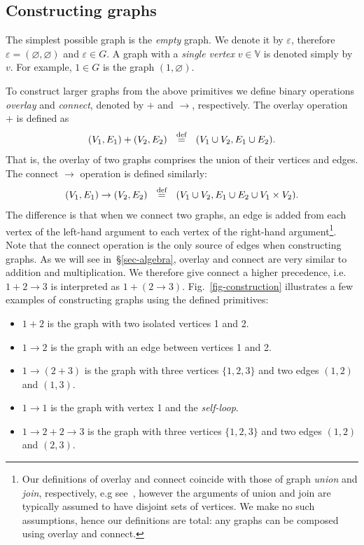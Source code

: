 \subsection{Constructing graphs}\label{sub-constructing}

The simplest possible graph is the \emph{empty} graph. We denote it by
$\varepsilon$, therefore $\varepsilon = (\varnothing, \varnothing)$ and
$\varepsilon \in G$. A graph with a \emph{single vertex} $v \in \mathbb{V}$
is denoted simply by $v$. For example, $1 \in G$ is the graph
$({1}, \varnothing)$.

To construct larger graphs from the above primitives we define binary
operations \emph{overlay} and \emph{connect}, denoted by $+$ and $\rightarrow$,
respectively. The overlay operation $+$ is defined as
\[
(V_1, E_1) + (V_2, E_2)~~\stackrel{\text{def}}{=}~~(V_1 \cup V_2, E_1 \cup E_2).
\]
That is, the overlay of two graphs comprises the union of their vertices and edges.
The connect $\rightarrow$ operation is defined similarly:
\[
(V_1, E_1) \rightarrow (V_2, E_2)~~\stackrel{\text{def}}{=}~~(V_1 \cup V_2, E_1 \cup E_2 \cup V_1 \times V_2).
\]
The difference is that when we connect two graphs, an edge is added from each
vertex of the left-hand argument to each vertex of the right-hand
argument\footnote{Our definitions of overlay and connect coincide
with those of graph \emph{union} and \emph{join}, respectively,
e.g see~\citet{1969_graph_theory_harary},
however the arguments of union and join are typically assumed to have disjoint
sets of vertices. We make no such assumptions, hence our definitions are total:
any graphs can be composed using overlay and connect.}.
Note that the connect operation is the only source of edges when constructing
graphs. As we will see in~\S\ref{sec-algebra}, overlay and connect
are very similar to addition and multiplication. We therefore give connect a higher
precedence, i.e. $1 + 2 \rightarrow 3$ is interpreted as $1 + (2 \rightarrow 3)$.
Fig.~\ref{fig-construction} illustrates a few examples of constructing graphs
using the defined primitives:
\begin{itemize}
  \item $1 + 2$ is the graph with two isolated vertices 1 and 2.
  \item $1 \rightarrow 2$ is the graph with an edge between vertices 1 and 2.
  \item $1 \rightarrow (2 + 3)$ is the graph with three vertices $\{1, 2, 3\}$
  and two edges $(1, 2)$ and $(1, 3)$.
  \item $1 \rightarrow 1$ is the graph with vertex 1 and the \emph{self-loop}.
  \item $1 \rightarrow 2 + 2 \rightarrow 3$ is the graph with three vertices $\{1, 2, 3\}$
  and two edges $(1, 2)$ and $(2, 3)$.
\end{itemize}

